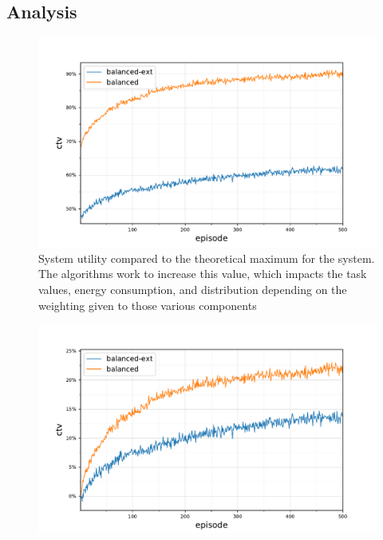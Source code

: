 \subsection{Analysis}
\begin{figure}[ht]
	\centering
	\includegraphics[width=0.7\linewidth]{5balanced_ctv-optimal-ctv}
	\captionsetup{labelfont=bf,singlelinecheck=on}
	\caption{System utility compared to the theoretical maximum for the \simulationSimple{}{} system. The algorithms work to increase this value, which impacts the task values, energy consumption, and distribution depending on the weighting given to those various components }
	\label{fig:5_ctv-optimal-ctv}
\end{figure}
\begin{figure}[ht]
	\centering
	\includegraphics[width=0.7\linewidth]{5balanced_ctv-optimal-ctv-gain}
	\captionsetup{labelfont=bf,singlelinecheck=on}
	\caption{}
	\label{fig:5_ctv-optimal-ctv-gain}
\end{figure}

